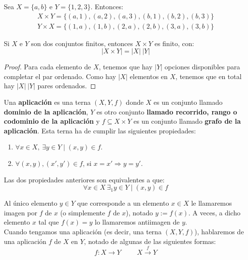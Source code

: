 \begin{ejemplo}
    Sea $X=\{a,b\}$ e $Y=\{1,2,3\}$. Entonces:
    \begin{gather*}
        X\times Y = \{(a,1), (a,2), (a,3), (b,1), (b,2), (b,3)\} \\
        Y\times X = \{(1,a), (1,b), (2,a), (2,b), (3,a), (3,b)\}
    \end{gather*}
\end{ejemplo}

\begin{prop}
    Si $X$ e $Y$ son dos conjuntos finitos, entonces $X\times Y$ es finito, con:
    \begin{equation*}
        |X\times Y|=|X|~|Y|
    \end{equation*}
\end{prop}
\begin{proof}
    Para cada elemento de $X$, tenemos que hay $|Y|$ opciones disponibles para completar el par ordenado. Como hay $|X|$ elementos en $X$, tenemos que en total hay $|X|~|Y|$ pares ordenados.
\end{proof}


\begin{definicion}[Aplicación]
    Una \textbf{aplicación} es una terna $(X, Y, f)$ donde $X$ es un conjunto llamado \textbf{dominio de la aplicación}, $Y$ es otro conjunto \textbf{llamado recorrido, rango o codominio de la aplicación} y $f\subseteq X\times Y$ es un conjunto llamado \textbf{grafo de la aplicación}. Esta terna ha de cumplir las siguientes propiedades:
    \begin{enumerate}
        \item $\forall x \in X,~\exists y \in Y \mid (x, y) \in f$.
        \item $\forall (x,y), (x',y') \in f$, si $x=x'\Longrightarrow y=y'$.
    \end{enumerate}
\end{definicion}

Las dos propiedades anteriores son equivalentes a que:
$$\forall x \in X~\exists_1 y \in Y \mid (x,y) \in f$$

Al único elemento $y \in Y$ que corresponde a un elemento $x \in X$ le llamaremos imagen por $f$ de $x$ (o simplemente $f$ de $x$), notado $y:=f(x)$. A veces, a dicho elemento $x$ tal que $f(x)=y$ lo llamaremos antiimagen de $y$.\\

Cuando tengamos una aplicación (es decir, una terna $(X, Y, f)$), hablaremos de una aplicación $f$ de $X$ en $Y$, notado de algunas de las siguientes formas:
\begin{equation*}
    f:X\longrightarrow Y
    \hspace{1cm}
    X \stackrel{f}{\longrightarrow} Y
\end{equation*}

